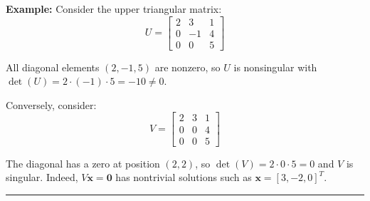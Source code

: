 \textbf{Example:} Consider the upper triangular matrix:
$$U = \begin{bmatrix} 2 & 3 & 1 \\ 0 & -1 & 4 \\ 0 & 0 & 5 \end{bmatrix}$$

All diagonal elements $(2, -1, 5)$ are nonzero, so $U$ is nonsingular with $\det(U) = 2 \cdot (-1) \cdot 5 = -10 \neq 0$.

Conversely, consider:
$$V = \begin{bmatrix} 2 & 3 & 1 \\ 0 & 0 & 4 \\ 0 & 0 & 5 \end{bmatrix}$$

The diagonal has a zero at position $(2,2)$, so $\det(V) = 2 \cdot 0 \cdot 5 = 0$ and $V$ is singular. Indeed, $V\mathbf{x} = \mathbf{0}$ has nontrivial solutions such as $\mathbf{x} = [3, -2, 0]^T$.

\vspace{2em}
\noindent\rule{\textwidth}{0.4pt}
